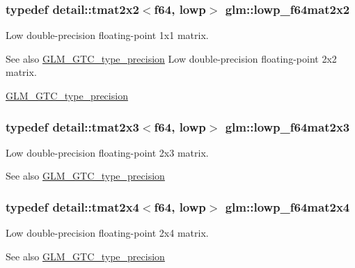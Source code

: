 \subsubsection[{\texorpdfstring{lowp\+\_\+f64mat2x2}{lowp_f64mat2x2}}]{\setlength{\rightskip}{0pt plus 5cm}typedef detail\+::tmat2x2$<$f64, lowp$>$ {\bf glm\+::lowp\+\_\+f64mat2x2}}\hypertarget{group__gtc__type__precision_ga38e41c5332b4eb20b23b4ed1f06608d4}{}\label{group__gtc__type__precision_ga38e41c5332b4eb20b23b4ed1f06608d4}
Low double-\/precision floating-\/point 1x1 matrix. \begin{DoxySeeAlso}{See also}
\hyperlink{group__gtc__type__precision}{G\+L\+M\+\_\+\+G\+T\+C\+\_\+type\+\_\+precision} Low double-\/precision floating-\/point 2x2 matrix. 

\hyperlink{group__gtc__type__precision}{G\+L\+M\+\_\+\+G\+T\+C\+\_\+type\+\_\+precision} 
\end{DoxySeeAlso}
\subsubsection[{\texorpdfstring{lowp\+\_\+f64mat2x3}{lowp_f64mat2x3}}]{\setlength{\rightskip}{0pt plus 5cm}typedef detail\+::tmat2x3$<$f64, lowp$>$ {\bf glm\+::lowp\+\_\+f64mat2x3}}\hypertarget{group__gtc__type__precision_ga2add7d48faba102f53fbad2e14dfed12}{}\label{group__gtc__type__precision_ga2add7d48faba102f53fbad2e14dfed12}
Low double-\/precision floating-\/point 2x3 matrix. \begin{DoxySeeAlso}{See also}
\hyperlink{group__gtc__type__precision}{G\+L\+M\+\_\+\+G\+T\+C\+\_\+type\+\_\+precision} 
\end{DoxySeeAlso}
\subsubsection[{\texorpdfstring{lowp\+\_\+f64mat2x4}{lowp_f64mat2x4}}]{\setlength{\rightskip}{0pt plus 5cm}typedef detail\+::tmat2x4$<$f64, lowp$>$ {\bf glm\+::lowp\+\_\+f64mat2x4}}\hypertarget{group__gtc__type__precision_ga38366c50f2a2755c49110c7fc1441683}{}\label{group__gtc__type__precision_ga38366c50f2a2755c49110c7fc1441683}
Low double-\/precision floating-\/point 2x4 matrix. \begin{DoxySeeAlso}{See also}
\hyperlink{group__gtc__type__precision}{G\+L\+M\+\_\+\+G\+T\+C\+\_\+type\+\_\+precision} 
\end{DoxySeeAlso}

